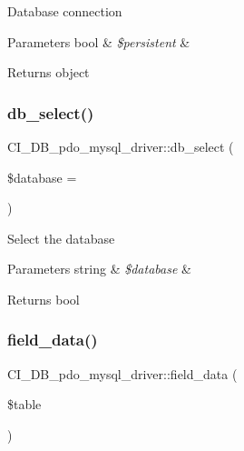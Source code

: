 Database connection


\begin{DoxyParams}[1]{Parameters}
bool & {\em \$persistent} & \\
\hline
\end{DoxyParams}
\begin{DoxyReturn}{Returns}
object 
\end{DoxyReturn}
\mbox{\label{class_c_i___d_b__pdo__mysql__driver_af8f4b4cd0dce2a1ef43c695744cbbbaa}} 
\subsubsection{\texorpdfstring{db\+\_\+select()}{db\_select()}}
{\footnotesize\ttfamily C\+I\+\_\+\+D\+B\+\_\+pdo\+\_\+mysql\+\_\+driver\+::db\+\_\+select (\begin{DoxyParamCaption}\item[{}]{\$database = {\ttfamily \textquotesingle{}\textquotesingle{}} }\end{DoxyParamCaption})}

Select the database


\begin{DoxyParams}[1]{Parameters}
string & {\em \$database} & \\
\hline
\end{DoxyParams}
\begin{DoxyReturn}{Returns}
bool 
\end{DoxyReturn}
\mbox{\label{class_c_i___d_b__pdo__mysql__driver_a678a7f3f1a0b06d22882b89b9d7f5e82}} 
\subsubsection{\texorpdfstring{field\+\_\+data()}{field\_data()}}
{\footnotesize\ttfamily C\+I\+\_\+\+D\+B\+\_\+pdo\+\_\+mysql\+\_\+driver\+::field\+\_\+data (\begin{DoxyParamCaption}\item[{}]{\$table }\end{DoxyParamCaption})}

